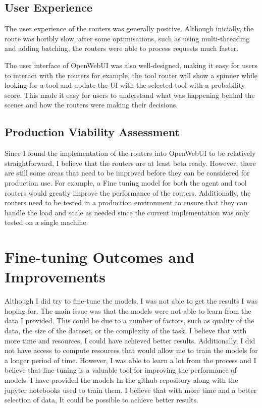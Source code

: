 \subsection{User Experience}
\label{sec:results-user-experience}

The user experience of the routers was generally positive. Although inicially, the route was horibly slow, after some optimisations, such as using multi-threading and adding batching, the routers were able to process requests much faster.

The user interface of OpenWebUI was also well-designed, making it easy for users to interact with the routers for example, the tool router will show a spinner while looking for a tool and update the UI with the selected tool with a probability score. This made it easy for users to understand what was happening behind the scenes and how the routers were making their decisions.

\subsection{Production Viability Assessment}
\label{sec:results-production-viability}

Since I found the implementation of the routers into OpenWebUI to be relatively straightforward, I believe that the routers are at least beta ready. However, there are still some areas that need to be improved before they can be considered for production use. For example, a Fine tuning model for both the agent and tool routers would greatly improve the performance of the routers. Additionally, the routers need to be tested in a production environment to ensure that they can handle the load and scale as needed since the current implementation was only tested on a single machine.

\section{Fine-tuning Outcomes and Improvements}
\label{sec:results-fine-tuning}

Although I did try to fine-tune the models, I was not able to get the results I was hoping for. The main issue was that the models were not able to learn from the data I provided. This could be due to a number of factors, such as quality of the data, the size of the dataset, or the complexity of the task. I believe that with more time and resources, I could have achieved better results. Additionally, I did not have access to compute resources that would allow me to train the models for a longer period of time. However, I was able to learn a lot from the process and I believe that fine-tuning is a valuable tool for improving the performance of models. I have provided the models In the github repository along with the jupyter notebooks used to train them. I believe that with more time and a better selection of data, It could be possible to achieve better results.

